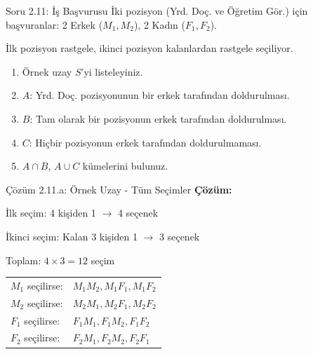 \documentclass[light]{lutbeamer}
\begin{document}
\begin{frame}{Soru 2.11: İş Başvurusu}
    \small
    İki pozisyon (Yrd. Doç. ve Öğretim Gör.) için başvuranlar: 2 Erkek ($M_1, M_2$), 2 Kadın ($F_1, F_2$).
    
    İlk pozisyon rastgele, ikinci pozisyon kalanlardan rastgele seçiliyor.
    \begin{enumerate}
        \item Örnek uzay $S$'yi listeleyiniz.
        \item $A$: Yrd. Doç. pozisyonunun bir erkek tarafından doldurulması.
        \item $B$: Tam olarak bir pozisyonun erkek tarafından doldurulması.
        \item $C$: Hiçbir pozisyonun erkek tarafından doldurulmaması.
        \item $A \cap B$, $A \cup C$ kümelerini bulunuz.
    \end{enumerate}
\end{frame}

\begin{frame}{Çözüm 2.11.a: Örnek Uzay - Tüm Seçimler}
    \color{blue}
    \textbf{Çözüm:}
    
    İlk seçim: 4 kişiden 1 $\rightarrow$ 4 seçenek
    
    İkinci seçim: Kalan 3 kişiden 1 $\rightarrow$ 3 seçenek
    
    Toplam: $4 \times 3 = 12$ seçim
    
    \vspace{0.3cm}
    \footnotesize
    \begin{center}
    \begin{tabular}{ll}
        $M_1$ seçilirse: & $M_1M_2, M_1F_1, M_1F_2$ \\
        $M_2$ seçilirse: & $M_2M_1, M_2F_1, M_2F_2$ \\
        $F_1$ seçilirse: & $F_1M_1, F_1M_2, F_1F_2$ \\
        $F_2$ seçilirse: & $F_2M_1, F_2M_2, F_2F_1$ \\
    \end{tabular}
    \end{center}
    
    \begin{center}
    \end{center}
\end{frame}
\end{document}

